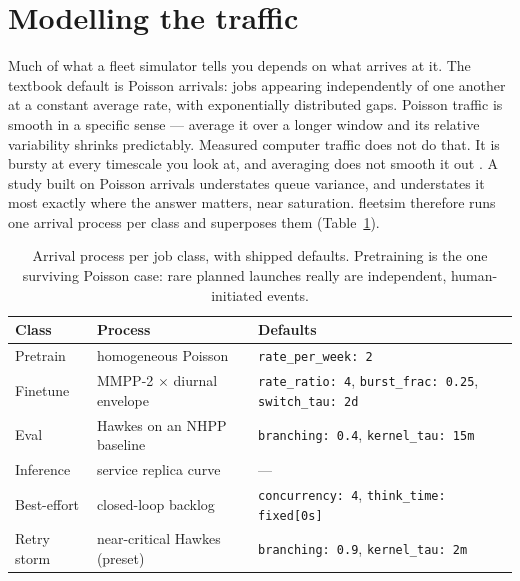 \section{Modelling the traffic}
\label{sec:traffic}

Much of what a fleet simulator tells you depends on what arrives at it. The
textbook default is Poisson arrivals: jobs appearing independently of one another
at a constant average rate, with exponentially distributed gaps. Poisson traffic
is smooth in a specific sense --- average it over a longer window and its
relative variability shrinks predictably. Measured computer traffic does not do
that. It is bursty at every timescale you look at, and averaging does not smooth
it out \cite{paxsonfloyd1995}. A study built on Poisson arrivals understates
queue variance, and understates it most exactly where the answer matters, near
saturation. fleetsim therefore runs one arrival process per class and superposes
them (Table~\ref{tab:arrivals}).

\begin{table}[t]
\centering\small
\caption{Arrival process per job class, with shipped defaults. Pretraining is
the one surviving Poisson case: rare planned launches really are independent,
human-initiated events.}
\label{tab:arrivals}
\begin{tabular}{lll}
\toprule
Class & Process & Defaults \\
\midrule
Pretrain    & homogeneous Poisson              & \texttt{rate\_per\_week: 2} \\
Finetune    & MMPP-2 $\times$ diurnal envelope & \texttt{rate\_ratio: 4}, \texttt{burst\_frac: 0.25}, \texttt{switch\_tau: 2d} \\
Eval        & Hawkes on an NHPP baseline       & \texttt{branching: 0.4}, \texttt{kernel\_tau: 15m} \\
Inference   & service replica curve            & --- \\
Best-effort & closed-loop backlog              & \texttt{concurrency: 4}, \texttt{think\_time: fixed[0s]} \\
Retry storm & near-critical Hawkes (preset)    & \texttt{branching: 0.9}, \texttt{kernel\_tau: 2m} \\
\bottomrule
\end{tabular}
\end{table}

